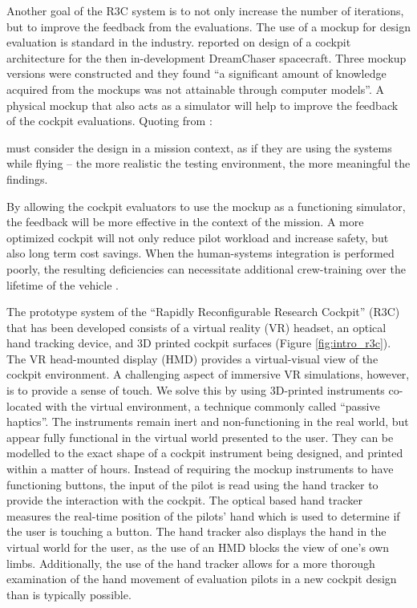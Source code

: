 Another goal of the R3C system is to not only increase the number of iterations, but to improve the feedback from the evaluations.
The use of a mockup for design evaluation is standard in the industry.
\citet{zea_development_2012} reported on design of a cockpit architecture for the then in-development DreamChaser spacecraft.
Three mockup versions were constructed and they found ``a significant amount of knowledge acquired from the mockups was not attainable through computer models''.
A physical mockup that also acts as a simulator will help to improve the feedback of the cockpit evaluations.
Quoting from \citet{sexton_cockpitcrew_1988}:
\begin{displayquote}
 must consider the design in a mission context, as if they are using the systems while flying -- the more realistic the testing environment, the more meaningful the findings.
\end{displayquote}
By allowing the cockpit evaluators to use the mockup as a functioning simulator, the feedback will be more effective in the context of the mission.
A more optimized cockpit will not only reduce pilot workload and increase safety, but also long term cost savings.
When the human-systems integration is performed poorly, the resulting deficiencies can necessitate additional crew-training over the lifetime of the vehicle \citep{jacobsen_crew_2010}.

The prototype system of the ``Rapidly Reconfigurable Research Cockpit'' (R3C) that has been developed consists of a virtual reality (VR) headset, an optical hand tracking device, and 3D printed cockpit surfaces (Figure \ref{fig:intro_r3c}).
The VR head-mounted display (HMD) provides a virtual-visual view of the cockpit environment.
A challenging aspect of immersive VR simulations, however, is to provide a sense of touch.
We solve this by using 3D-printed instruments co-located with the virtual environment, a technique commonly called ``passive haptics''.
The instruments remain inert and non-functioning in the real world, but appear fully functional in the virtual world presented to the user.
They can be modelled to the exact shape of a cockpit instrument being designed, and printed within a matter of hours.
Instead of requiring the mockup instruments to have functioning buttons, the input of the pilot is read using the hand tracker to provide the interaction with the cockpit.
The optical based hand tracker measures the real-time position of the pilots' hand which is used to determine if the user is touching a button.
The hand tracker also displays the hand in the virtual world for the user, as the use of an HMD blocks the view of one's own limbs.
Additionally, the use of the hand tracker allows for a more thorough examination of the hand movement of evaluation pilots in a new cockpit design than is typically possible.

